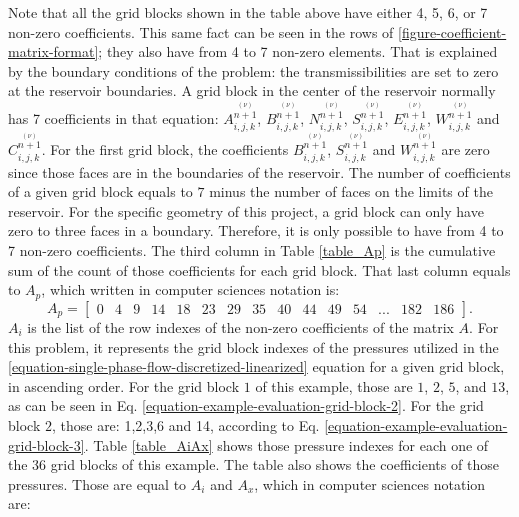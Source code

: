 \vspace{-5.5ex}
%
Note that all the grid blocks shown in the table above have either 4, 5, 6, or 7 non-zero coefficients. 
%
This same fact can be seen in the rows of \ref{figure-coefficient-matrix-format}; they also have from 4 to 7 non-zero elements. 
%
That is explained by the boundary conditions of the problem: the transmissibilities are set to zero at the reservoir boundaries. 
%
A grid block in the center of the reservoir normally has 7 coefficients in that equation: $A^{\stackrel{(\nu)}{n+1}}_{i,j,k}$, $B^{\stackrel{(\nu)}{n+1}}_{i,j,k}$, $N^{\stackrel{(\nu)}{n+1}}_{i,j,k}$, $S^{\stackrel{(\nu)}{n+1}}_{i,j,k}$, $E^{\stackrel{(\nu)}{n+1}}_{i,j,k}$, $W^{\stackrel{(\nu)}{n+1}}_{i,j,k}$ and $C^{\stackrel{(\nu)}{n+1}}_{i,j,k}$.
%
For the first grid block, the coefficients $B^{\stackrel{(\nu)}{n+1}}_{i,j,k}$, $S^{\stackrel{(\nu)}{n+1}}_{i,j,k}$ and $W^{\stackrel{(\nu)}{n+1}}_{i,j,k}$ are zero since those faces are in the boundaries of the reservoir. 
%
The number of coefficients of a given grid block equals to $7$ minus the number of faces on the limits of the reservoir. 
%
For the specific geometry of this project, a grid block can only have zero to three faces in a boundary. 
%
Therefore, it is only possible to have from 4 to 7 non-zero coefficients. 
%
The third column in Table \ref{table_Ap} is the cumulative sum of the count of those coefficients for each grid block. 
%
That last column equals to $A_p$, which written in computer sciences notation is:
%
\begin{equation}
	\label{equation-Ap-example}
	A_p = 
	\begin{bmatrix}
		0	&4	&9	&14	&18	&23	&29	&35 &40 &44 &49 &54 &... &182 &186
	\end{bmatrix}
	.
\end{equation}
%
$A_i$ is the list of the row indexes of the non-zero coefficients of the matrix $A$. 
%
For this problem, it represents the grid block indexes of the pressures utilized in the \ref{equation-single-phase-flow-discretized-linearized} equation for a given grid block, in ascending order. 
%
For the grid block $1$ of this example, those are $1$, $2$, $5$, and $13$, as can be seen in Eq. \ref{equation-example-evaluation-grid-block-2}. 
%
For the grid block $2$, those are: 1,2,3,6 and 14, according to Eq. \ref{equation-example-evaluation-grid-block-3}. 
%
Table \ref{table_AiAx} shows those pressure indexes for each one of the 36 grid blocks of this example. 
%
The table also shows the coefficients of those pressures. 
%
Those are equal to $A_i$ and $A_x$, which in computer sciences notation are:

